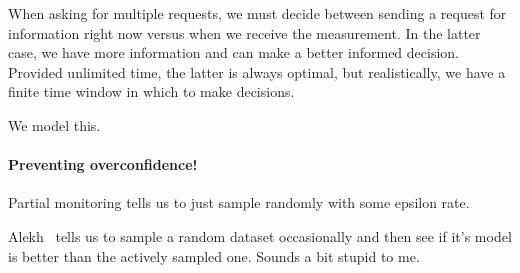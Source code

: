 When asking for multiple requests, we must decide between sending a request for information right now versus when we receive the measurement.
In the latter case, we have more information and can make a better informed decision.
Provided unlimited time, the latter is always optimal, but realistically, we have a finite time window in which to make decisions.

We model this.

\paragraph{Preventing overconfidence!}
Partial monitoring tells us to just sample randomly with some epsilon rate.

Alekh~\cite{agarwal2013selective} tells us to sample a random dataset occasionally and then see if it's model is better than the actively sampled one. Sounds a bit stupid to me.

